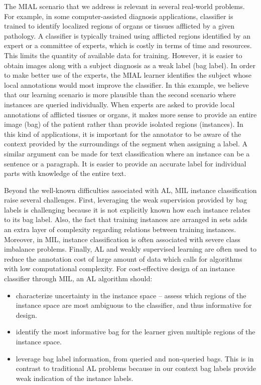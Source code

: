 \documentclass{article}
\begin{document}
The MIAL scenario that we address is relevant in several real-world problems. For example, in some computer-assisted diagnosis applications, classifier is trained to identify localized regions of organs or tissues afflicted by a given pathology. A classifier is typically trained using afflicted regions identified by an expert or a committee of experts, which is costly in terms of time and resources. This limits the quantity of available data for training. However, it is easier to obtain images along with a subject diagnosis as a weak label (bag label). In order to make better use of the experts, the MIAL learner identifies the subject whose local annotations would most improve the classifier. In this example, we believe that our learning scenario is more plausible than the second scenario where instances are queried individually. When experts are asked to provide local annotations of afflicted tissues or organs, it makes more sense to provide an entire image (bag) of the patient rather than provide isolated regions (instances). In this kind of applications, it is important for the annotator to be aware of the context provided by the surroundings of the segment when assigning a label. A similar argument can be made for text classification where an instance can be a sentence or a paragraph. It is easier to provide an accurate label for individual parts with knowledge of the entire text. 


Beyond the well-known difficulties associated with AL, MIL instance classification raise several challenges. First, leveraging the weak supervision provided by bag labels is challenging because it is not explicitly known how each instance relates to its bag label. Also, the fact that training instances are arranged in sets adds an extra layer of complexity regarding relations between training instances. Moreover, in MIL, instance classification is often associated with severe class imbalance problems. Finally, AL and weakly supervised learning are often used to reduce the annotation cost of large amount of data which calls for algorithms with low computational complexity. For cost-effective design of an instance classifier through MIL, an AL algorithm should:
\begin{itemize}
\item characterize uncertainty in the instance space -- assess which regions of the instance space are	most ambiguous to the classifier, and thus informative for design.
\item identify the most informative bag for the learner given multiple regions of the instance space. 
\item leverage bag label information, from queried and non-queried bags. This is in contrast to traditional AL problems because in our context bag labels provide weak indication of the instance labels.
\end{itemize}
\end{document}
